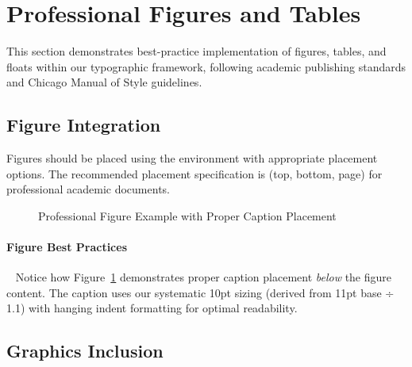 \documentclass[11pt]{article}
\begin{document}
\section{Professional Figures and Tables}

This section demonstrates best-practice implementation of figures, tables, and floats within our typographic framework, following academic publishing standards and Chicago Manual of Style guidelines.

\subsection{Figure Integration}

Figures should be placed using the  environment with appropriate placement options. The recommended placement specification is \code{[tbp]} (top, bottom, page) for professional academic documents.

\begin{figure}[tbp]
  \centering
  \caption{Professional Figure Example with Proper Caption Placement}
  \label{fig:professional-example}
  \begin{fignotes}
  \end{fignotes}
\end{figure}

\paragraph{Figure Best Practices}~ Notice how Figure~\ref{fig:professional-example} demonstrates proper caption placement \emph{below} the figure content. The caption uses our systematic 10pt sizing (derived from 11pt base ÷ 1.1) with hanging indent formatting for optimal readability.

\subsection{Graphics Inclusion}
\end{document}
